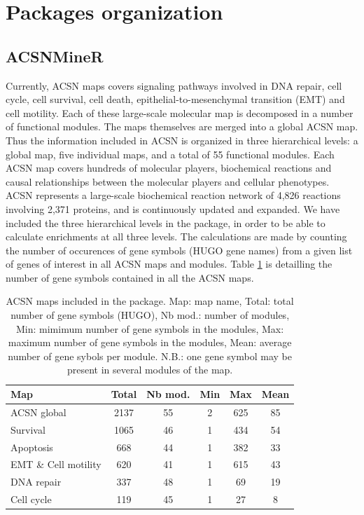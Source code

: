\documentclass[article]{jss}
\begin{document}
\section[Package organization]{Packages organization}

\subsection{ACSNMineR}
Currently, ACSN maps covers signaling pathways involved in DNA repair, cell
cycle, cell survival, cell death, epithelial-to-mesenchymal transition (EMT) and
cell motility. Each of these large-scale molecular map is decomposed in a number
of functional modules. The maps themselves are merged into a global ACSN map.
Thus the information included in ACSN is organized in three hierarchical levels:
a global map, five individual maps, and a total of 55 functional modules. Each
ACSN map covers hundreds of molecular players, biochemical reactions and causal
relationships between the molecular players and cellular phenotypes.  ACSN
represents a large-scale biochemical reaction network of 4,826 reactions
involving 2,371 proteins, and is continuously updated and expanded.  We have
included the three hierarchical levels in the  package, in order
to be able to calculate enrichments at all three levels. The calculations are
made by counting the number of occurences of gene symbols (HUGO gene names) from
a given list of genes of interest in all ACSN maps and modules. Table
\ref{tab:table1} is detailling the number of gene symbols contained in all the ACSN
maps.


\begin{table}[h!]
 \centering
  \caption{ACSN maps included in the  package. Map: map name, Total: total
  number of gene symbols (HUGO), Nb mod.: number of modules, Min: mimimum
  number of gene symbols in the modules, Max: maximum number of gene symbols in
  the modules, Mean: average number of gene sybols per module. N.B.: one gene
  symbol may be present in several modules of the map.}
  \label{tab:table1}
  \begin{tabular}{l|c|c|c|c|c}
    \hline
    Map & Total & Nb mod. & Min & Max & Mean\\
    \hline
  ACSN global & 2137 & 55 & 2 &625& 85\\
  Survival  &1065&46  &1 &434 &54\\
  Apoptosis & 668&44 & 1& 382& 33\\
  EMT \& Cell motility &620 &41  &1 &615 &43\\
  DNA repair &337&48  &1 &69  &19\\
  Cell cycle &119&45  &1 &27  &8\\
  \hline

  \end{tabular}

\end{table}
\end{document}
